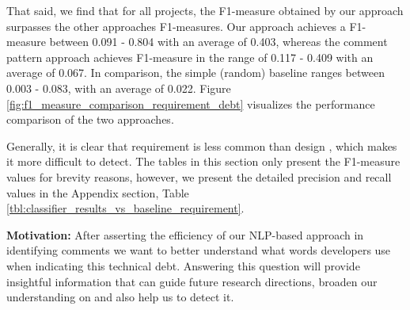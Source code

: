 That said, we find that for all projects, the F1-measure obtained by our approach surpasses the other approaches F1-measures. Our approach achieves a F1-measure between 0.091 - 0.804 with an average of 0.403, whereas the comment pattern approach achieves F1-measure in the range of 0.117 - 0.409 with an average of 0.067. In comparison, the simple (random) baseline ranges between 0.003 - 0.083, with an average of 0.022. Figure \ref{fig:f1_measure_comparison_requirement_debt} visualizes the performance comparison of the two approaches.

Generally, it is clear that requirement \SATD is less common than design \SATD, which makes it more difficult to detect. The tables in this section only present the F1-measure values for brevity reasons, however, we present the detailed precision and recall values in the Appendix section, Table \ref{tbl:classifier_results_vs_baseline_requirement}.


\vspace{3mm}
\noindent\rqii
\vspace{3mm}

\noindent \textbf{Motivation:} After asserting the efficiency of our NLP-based approach in identifying \SATD comments we want to better understand what words developers use when indicating this technical debt. Answering this question will provide insightful information that can guide future research directions, broaden our understanding on \SATD and also help us to detect it.     

